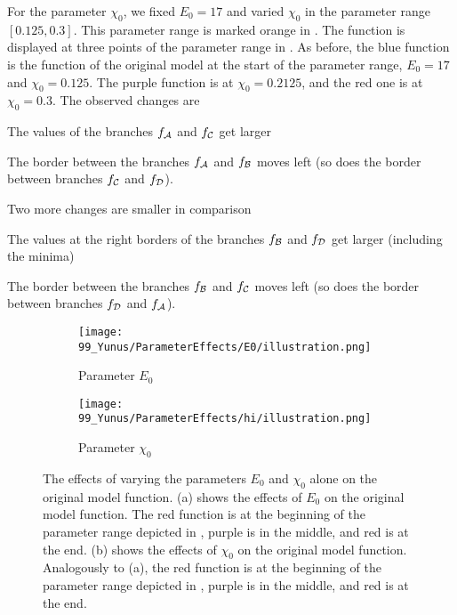 For the parameter $\chi_0$, we fixed $E_0 = 17$ and varied $\chi_0$ in the parameter range $[0.125, 0.3]$.
This parameter range is marked orange in .
The function is displayed at three points of the parameter range in .
As before, the blue function is the function of the original model at the start of the parameter range, $E_0 = 17$ and $\chi_0 = 0.125$.
The purple function is at $\chi_0 = 0.2125$, and the red one is at $\chi_0 = 0.3$.
The observed changes are
\begin{enumerate*}
	\item The values of the branches $f_{\mathcal{A}}$ and $f_{\mathcal{C}}$ get larger
	\item The border between the branches $f_{\mathcal{A}}$ and $f_{\mathcal{B}}$ moves left (so does the border between branches $f_{\mathcal{C}}$ and $f_{\mathcal{D}}$).
\end{enumerate*}
Two more changes are smaller in comparison
\begin{enumerate*}
	\item The values at the right borders of the branches $f_{\mathcal{B}}$ and $f_{\mathcal{D}}$ get larger (including the minima)
	\item The border between the branches $f_{\mathcal{B}}$ and $f_{\mathcal{C}}$ moves left (so does the border between branches $f_{\mathcal{D}}$ and $f_{\mathcal{A}}$).
\end{enumerate*}

\begin{figure}
	\centering
	\begin{subfigure}{0.4\textwidth}
		\texttt{[image: 99\_Yunus/ParameterEffects/E0/illustration.png]}
		\caption{Parameter $E_0$}
		\label{fig:setup.char.evolution.e0}
	\end{subfigure}
	\begin{subfigure}{0.4\textwidth}
		\texttt{[image: 99\_Yunus/ParameterEffects/hi/illustration.png]}
		\caption{Parameter $\chi_0$}
		\label{fig:setup.char.evolution.hi}
	\end{subfigure}
	\caption[The effects of single parameters on the original model function]{
		The effects of varying the parameters $E_0$ and $\chi_0$ alone on the original model function.
		(a) shows the effects of $E_0$ on the original model function.
		The red function is at the beginning of the parameter range depicted in , purple is in the middle, and red is at the end.
		(b) shows the effects of $\chi_0$ on the original model function.
		Analogously to (a), the red function is at the beginning of the parameter range depicted in , purple is in the middle, and red is at the end.
	}
	\label{fig:setup.char.evolution.single}
\end{figure}

